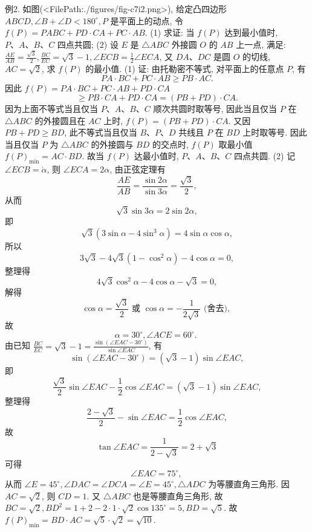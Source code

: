 例2. 如图(<FilePath:./figures/fig-c7i2.png>), 给定凸四边形 $A B C D, \angle B+ \angle D<180^{\circ}, P$ 是平面上的动点, 令 $f(P)=P A B C+P D \cdot C A+P C \cdot A B$.
(1) 求证: 当 $f(P)$ 达到最小值时, $P 、 A 、 B 、 C$ 四点共圆;
(2) 设 $E$ 是 $\triangle A B C$ 外接圆 $O$ 的 $A B$ 上一点, 满足: $\frac{A E}{A B}=\frac{\sqrt{3}}{2}, \frac{B C}{E C}=\sqrt{3}-1, \angle E C B=\frac{1}{2} \angle E C A$, 又 $D A 、 D C$ 是圆 $O$ 的切线, $A C=\sqrt{2}$, 求 $f(P)$ 的最小值.
(1) 证: 由托勒密不等式, 对平面上的任意点 $P$, 有
$$
P A \cdot B C+P C \cdot A B \geqslant P B \cdot A C .
$$
因此 $f(P)=P A \cdot B C+P C \cdot A B+P D \cdot C A$
$$
\geqslant P B \cdot C A+P D \cdot C A=(P B+P D) \cdot C A .
$$
因为上面不等式当且仅当 $P 、 A 、 B 、 C$ 顺次共圆时取等号, 因此当且仅当 $P$ 在 $\triangle A B C$ 的外接圆且在 $A C$ 上时, $f(P)=(P B+P D) \cdot C A$.
又因 $P B+P D \geqslant B D$, 此不等式当且仅当 $B 、 P 、 D$ 共线且 $P$ 在 $B D$ 上时取等号.
因此当且仅当 $P$ 为 $\triangle A B C$ 的外接圆与 $B D$ 的交点时, $f(P)$ 取最小值 $f(P)_{\min }=A C \cdot B D$.
故当 $f(P)$ 达最小值时, $P 、 A 、 B 、 C$ 四点共圆.
(2) 记 $\angle E C B=\dot{\alpha}$, 则 $\angle E C A=2 \alpha$, 由正弦定理有
$$
\frac{A E}{A B}=\frac{\sin 2 \alpha}{\sin 3 \alpha}=\frac{\sqrt{3}}{2},
$$
从而
$$
\sqrt{3} \sin 3 \alpha=2 \sin 2 \alpha,
$$
即
$$
\sqrt{3}\left(3 \sin \alpha-4 \sin ^3 \alpha\right)=4 \sin \alpha \cos \alpha,
$$
所以
$$
3 \sqrt{3}-4 \sqrt{3}\left(1-\cos ^2 \alpha\right)-4 \cos \alpha=0,
$$
整理得
$$
4 \sqrt{3} \cos ^2 \alpha-4 \cos \alpha-\sqrt{3}=0,
$$
解得
$$
\cos \alpha=\frac{\sqrt{3}}{2} \text { 或 } \cos \alpha=-\frac{1}{2 \sqrt{3}} \text { (舍去), }
$$
故
$$
\alpha=30^{\circ}, \angle A C E=60^{\circ} \text {. }
$$
由已知 $\frac{B C}{E C}=\sqrt{3}-1=\frac{\sin \left(\angle E A C-30^{\circ}\right)}{\sin \angle E A C}$, 有
$$
\sin \left(\angle E A C-30^{\circ}\right)=(\sqrt{3}-1) \sin \angle E A C,
$$
即
$$
\frac{\sqrt{3}}{2} \sin \angle E A C-\frac{1}{2} \cos \angle E A C=(\sqrt{3}-1) \sin \angle E A C,
$$
整理得
$$
\frac{2-\sqrt{3}}{2}-\sin \angle E A C=\frac{1}{2} \cos \angle E A C,
$$
故
$$
\tan \angle E A C=\frac{1}{2-\sqrt{3}}=2+\sqrt{3}
$$
可得
$$
\angle E A C=75^{\circ} \text {, }
$$
从而 $\angle E=45^{\circ}, \angle D A C=\angle D C A=\angle E=45^{\circ}, \triangle A D C$ 为等腰直角三角形.
因 $A C=\sqrt{2}$, 则 $C D=1$.
又 $\triangle A B C$ 也是等腰直角三角形, 故 $B C=\sqrt{2}, B D^2=1+2-2 \cdot 1 \cdot \sqrt{2} \cos 135^{\circ}=5, B D=\sqrt{5}$.
故 $f(P)_{\min }=B D \cdot A C=\sqrt{5} \cdot \sqrt{2}=\sqrt{10}$.



